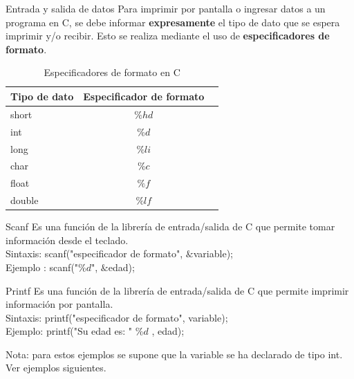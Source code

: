 \documentclass[xcolor=pdftex,table,11pt]{beamer}
\begin{document}
\begin{frame}[allowframebreaks] {Entrada y salida de datos}
Para imprimir por pantalla o ingresar datos a un programa en C, se debe informar \textbf{expresamente} el tipo de dato que se espera imprimir y/o recibir.
Esto se realiza mediante el uso de \textbf{especificadores de formato}.

\begin{table}
\begin{tabular}{l | c | l }
Tipo de dato & Especificador de formato \\
\hline \hline
short & $\%hd$ \\ 
int & 	$\%d$ \\ 
long & 	$\%li$ \\ 
char & $\%c$\\ 
float & $\%f$ \\ 
double & $\%lf$\\ 
\end{tabular}
\caption{Especificadores de formato en C}
\end{table}
 \begin{block}{Scanf}
Es una función de la librería de entrada/salida de C que permite tomar información desde el teclado.\\ 

Sintaxis: scanf("especificador de formato", $\&$variable); \\ 
Ejemplo	: scanf("$\%d$", $\&$edad); \\ 
    \end{block}

 \begin{block}{Printf}
Es una función de la librería de entrada/salida de C que permite imprimir información por pantalla.\\ 
Sintaxis: printf("especificador de formato", variable); \\ 
Ejemplo: printf("Su edad es: " $\%d$ , edad);
    \end{block}
    

Nota: para estos ejemplos se supone que la variable se ha declarado de tipo int. Ver ejemplos siguientes.
\codesetstylefrombeamer
{}
\end{frame}
\end{document}
